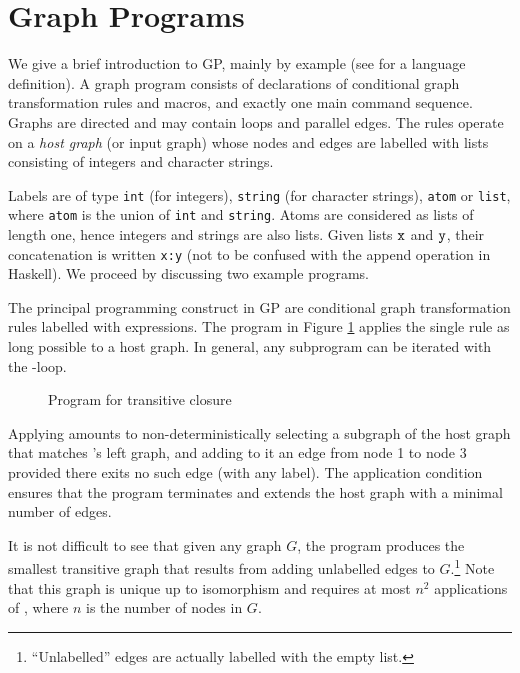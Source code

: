 \section{Graph Programs}
\label{sec:graph-programs}

We give a brief introduction to GP, mainly by example (see \cite{Plump12a} for a language definition). A graph program consists of declarations of conditional graph transformation rules and macros, and exactly one main command sequence. Graphs are directed and may contain  loops and parallel edges. The rules operate on a \emph{host graph}\/ (or input graph) whose nodes and edges are labelled with lists consisting of integers and character strings.

Labels are of type \texttt{int} (for integers), \texttt{string} (for character strings), \texttt{atom} or \texttt{list}, where \texttt{atom} is the union of \texttt{int} and \texttt{string}. Atoms are considered as lists of length one, hence integers and strings are also lists. Given lists $\mathtt{x}$ and $\mathtt{y}$, their concatenation is written \texttt{x:y} (not to be confused with the append operation in Haskell). 
We proceed by discussing two example programs.

\begin{example}
The principal programming construct in GP are conditional graph transformation rules labelled with expressions. The program in Figure \ref{fig:transitive-closure} applies the single rule  as long possible to a host graph. In general, any subprogram can be iterated with the \ttt{!}-loop.

\begin{figure}[htb]
\begin{center}
 
\end{center}
\caption{Program for transitive closure}\label{fig:transitive-closure}
\end{figure}

Applying  amounts to non-deterministically selecting a subgraph of the host graph that matches 's left graph, and adding to it an edge from node 1 to node 3 provided there exits no such edge (with any label). The application condition ensures that the program terminates and extends the host graph with a minimal number of edges.

It is not difficult to see that given any graph $G$, the program produces the smallest transitive graph that results from adding unlabelled edges to $G$.\footnote{``Unlabelled'' edges are actually labelled with the empty list.} Note that this graph is unique up to isomorphism and requires at most $n^2$ applications of , where $n$\/ is the number of nodes in $G$. %
\end{example}
  

